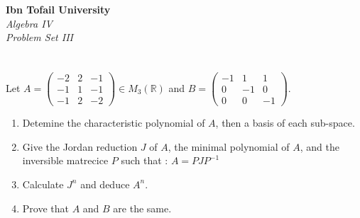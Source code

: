 \documentclass[12pt]{article}
\begin{document}
\begin{center}
\Large\textbf{Ibn Tofail University} \\[1em]
\large\textit{Algebra IV} \\[2em]
\large\textit{Problem Set III} \\[0.5em]
\end{center}

\vspace{1cm}

\section{}
Let $A = \begin{pmatrix} -2 & 2 & -1 \\ -1 & 1 & -1 \\ -1 & 2 & -2 \end{pmatrix} \in M_3(\mathbb{R})$ and $B = \begin{pmatrix} -1 & 1 & 1 \\ 0 & -1 & 0 \\ 0 & 0 & -1 \end{pmatrix}$. 
\begin{enumerate}
  \item Detemine the characteristic polynomial of $A$, then a basis of each sub-space. 
  \item Give the Jordan reduction $J$ of $A$, the minimal polynomial of $A$, and the inversible matrecice $P$ such that : $A = PJP^{-1}$
  \item Calculate $J^n$ and deduce $A^n$.
  \item Prove that $A$ and $B$ are the same.
\end{enumerate}
\end{document}

